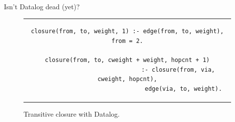 \documentclass[USenglish,aspectratio=169]{beamer} %
\begin{document}
\begin{frame}[fragile]{Isn't Datalog dead (yet)?}
    \pause
    \begin{figure}[h]
        \centering
        \begin{tabular}{c}
        \begin{lstlisting}[keepspaces]
closure(from, to, weight, 1) :- edge(from, to, weight), from = 2.

closure(from, to, cweight + weight, hopcnt + 1)
                             :- closure(from, via, cweight, hopcnt),
                                edge(via, to, weight).\end{lstlisting}
        \end{tabular}
        \caption{Transitive closure with Datalog.}\label{code:trans-closure-datalog}
    \end{figure}
\end{frame}

\begin{frame}
    \begin{itemize}
    \end{itemize}
\end{frame}
\end{document}
